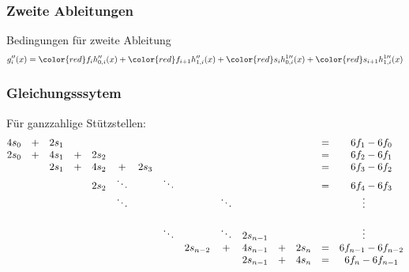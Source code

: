 %
%
%
\begin{frame}
\frametitle{Zweite Ableitungen}
Bedingungen für zweite Ableitung
\[
g_i''(x)
=
{\color{red}f_i}h_{0,i}''(x) + {\color{red}f_{i+1}}h_{1,i}''(x)
+
{\color{red}s_i}h^{1\prime\prime}_{0,i}(x) + {\color{red}s_{i+1}}h_{1,i}^{1\prime\prime}(x)
\]
\end{frame}

\begin{frame}
\frametitle{Gleichungsssytem}
Für ganzzahlige Stützstellen:
\[
\setcounter{MaxMatrixCols}{20}
\begin{matrix}
4s_0 &+& 2s_1 & &      & &      & &        & &        & &      &=& 6f_1-6f_0 \\
2s_0 &+& 4s_1 &+& 2s_2 & &      & &        & &        & &      &=& 6f_2-6f_1 \\
     & & 2s_1 &+& 4s_2 &+& 2s_3 & &        & &        & &      &=& 6f_3-6f_2 \\
     & &      & & 2s_2 &\ddots& &\ddots &  & &        & &      &=& 6f_4-6f_3 \\
     & &      & &      &\ddots& & &        &\ddots&   & &      & & \vdots\hspace*{15pt}    \\
     & &      & &      & &      & &        & &        & &      & & \\
     & &      & &      & &      &\ddots&   &\ddots&2s_{n-1}& &      & & \vdots\hspace*{15pt}          \\
     & &      & &      & &      & &2s_{n-2}&+&4s_{n-1}&+& 2s_n &=& 6f_{n-1}-6f_{n-2} \\
     & &      & &      & &      & &        & &2s_{n-1}&+& 4s_n &=& 6f_n-6f_{n-1} 
\end{matrix}
\]
\end{frame}
